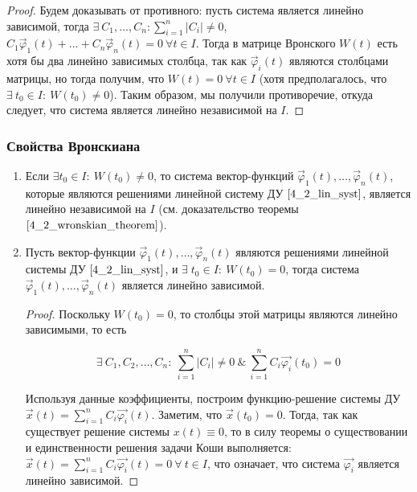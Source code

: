\begin{proof}
    Будем доказывать от противного: пусть система является линейно зависимой, тогда $\exists ~ C_1, \dots, C_n: \sum^n_{i = 1} |C_i| \neq 0$,
    $C_1 \overrightarrow \varphi_1(t) + \dots + C_n \overrightarrow \varphi_n(t) = 0 ~ \forall t \in I$. Тогда в матрице Вронского $W(t)$
    есть хотя бы два линейно зависимых столбца, так как $\overrightarrow \varphi_i(t)$ являются столбцами матрицы, но тогда получим, что
    $W(t) = 0 ~ \forall t \in I$ (хотя предполагалось, что $\exists ~ t_0 \in I : ~ W(t_0) \neq 0$). Таким образом, мы получили противоречие,
    откуда следует, что система является линейно независимой на $I$.
\end{proof}

\subsubsection{Свойства Вронскиана}

\begin{enumerate}
    \item Если $\exists t_0 \in I : ~ W(t_0) \neq 0$, то система вектор-функций $\overrightarrow \varphi_1(t), \dots, \overrightarrow \varphi_n(t)$, которые являются решениями линейной систему ДУ $\eqref{4_2_lin_syst}$, является линейно независимой на $I$ (см. доказательство теоремы $\eqref{4_2_wronskian_theorem}$).
    \item Пусть вектор-функции $\overrightarrow \varphi_1(t), \dots, \overrightarrow \varphi_n(t)$ являются решениями линейной системы ДУ $\eqref{4_2_lin_syst}$, и $\exists \; t_0 \in I: ~ W(t_0) = 0$, тогда система $\overrightarrow \varphi_1(t), \dots, \overrightarrow \varphi_n(t)$ является линейно зависимой.

    \begin{proof}
        Поскольку $W(t_0) = 0$, то столбцы этой матрицы являются линейно зависимыми, то есть
        
        \[ \exists ~ C_1, C_2, \dots, C_n : ~ \sum_{i = 1}^n |C_i| \neq 0 ~ \& ~ \sum_{i = 1}^n C_i \overrightarrow{\varphi_i}(t_0) = 0 \]
        
        Используя данные коэффициенты, построим функцию-решение системы ДУ $\overrightarrow{x}(t) = \sum_{i = 1}^n C_i \overrightarrow{\varphi_i}(t)$. Заметим, что $\overrightarrow{x}(t_0) = 0$. Тогда, так как существует решение системы $x(t) \equiv 0$, то в силу теоремы о существовании и единственности решения задачи Коши выполняется: $\overrightarrow{x}(t) = \sum_{i = 1}^n C_i \overrightarrow{\varphi_i}(t) = 0 ~ \forall ~ t \in I$, что означает, что система $\overrightarrow{\varphi_i}$ является линейно зависимой.
    \end{proof}
\end{enumerate}
